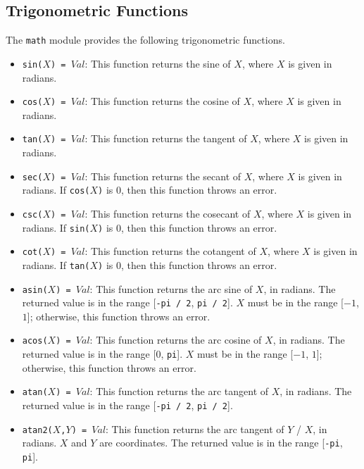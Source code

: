 \subsection{Trigonometric Functions}
The \texttt{math} module provides the following trigonometric functions.
\begin{itemize}
\item \texttt{sin($X$) = $Val$}: This function returns the sine of $X$, where $X$ is given in radians.
\item \texttt{cos($X$) = $Val$}: This function returns the cosine of $X$, where $X$ is given in radians.
\item \texttt{tan($X$) = $Val$}: This function returns the tangent of $X$, where $X$ is given in radians.  
\item \texttt{sec($X$) = $Val$}: This function returns the secant of $X$, where $X$ is given in radians.  If \texttt{cos($X$)} is $0$, then this function throws an error.
\item \texttt{csc($X$) = $Val$}: This function returns the cosecant of $X$, where $X$ is given in radians.  If \texttt{sin($X$)} is $0$, then this function throws an error.
\item \texttt{cot($X$) = $Val$}: This function returns the cotangent of $X$, where $X$ is given in radians.  If \texttt{tan($X$)} is $0$, then this function throws an error.
\item \texttt{asin($X$) = $Val$}: This function returns the arc sine of $X$, in radians.  The returned value is in the range [\texttt{-pi / 2}, \texttt{pi / 2}].  $X$ must be in the range [$-1$, $1$]; otherwise, this function throws an error.
\item \texttt{acos($X$) = $Val$}: This function returns the arc cosine of $X$, in radians.  The returned value is in the range [$0$, \texttt{pi}].  $X$ must be in the range [$-1$, $1$]; otherwise, this function throws an error.
\item \texttt{atan($X$) = $Val$}: This function returns the arc tangent of $X$, in radians.  The returned value is in the range [\texttt{-pi / 2}, \texttt{pi / 2}].
\item \texttt{atan2($X$,$Y$) = $Val$}: This function returns the arc tangent of $Y$ / $X$, in radians.  $X$ and $Y$ are coordinates.  The returned value is in the range [\texttt{-pi}, \texttt{pi}].  

\end{itemize}
